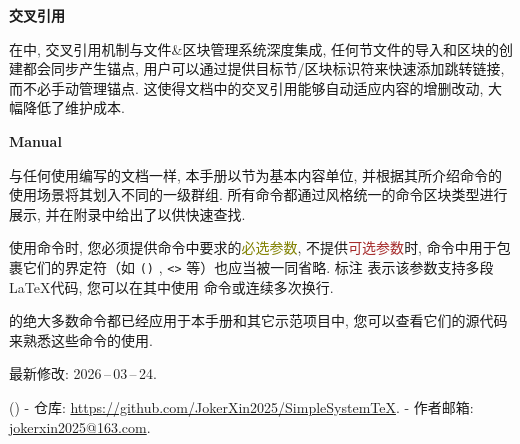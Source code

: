 \medskip\textbf{交叉引用}

在\SimpleSystemTeX 中, 交叉引用机制与文件\&区块管理系统深度集成, 任何节文件的导入和区块的创建都会同步产生锚点, 用户可以通过提供目标节/区块标识符来快速添加跳转链接, 而不必手动管理锚点. 这使得文档中的交叉引用能够自动适应内容的增删改动, 大幅降低了维护成本.

\medskip\SimpleSystemTeX[bf]\textbf{Manual}

与任何使用\SimpleSystemTeX 编写的文档一样, 本手册以节为基本内容单位, 并根据其所介绍命令的使用场景将其划入不同的一级群组. 所有命令都通过风格统一的命令区块类型进行展示, 并在附录中给出了以供快速查找.

使用\SimpleSystemTeX 命令时, 您必须提供命令中要求的\textcolor{olive}{必选参数}, 不提供\textcolor{brown}{可选参数}时, 命令中用于包裹它们的界定符（如 \texttt{()} , \texttt{<>} 等）也应当被一同省略. 标注 \texttt{\longarg} 表示该参数支持多段\LaTeX 代码, 您可以在其中使用  命令或连续多次换行.

\SimpleSystemTeX 的绝大多数命令都已经应用于本手册和其它示范项目中, 您可以查看它们的源代码来熟悉这些命令的使用.

最新修改: 2026\,--\,03\,--\,24.

\bigskip\bigskip\bigskip

(){
    - \SimpleSystemTeX 仓库: \href{https://github.com/JokerXin2025/SimpleSystemTeX}{https://github.com/JokerXin2025/SimpleSystemTeX}.
    - 作者邮箱: \href{mailto:jokerxin2025@163.com}{jokerxin2025@163.com}.
}

\newpage
